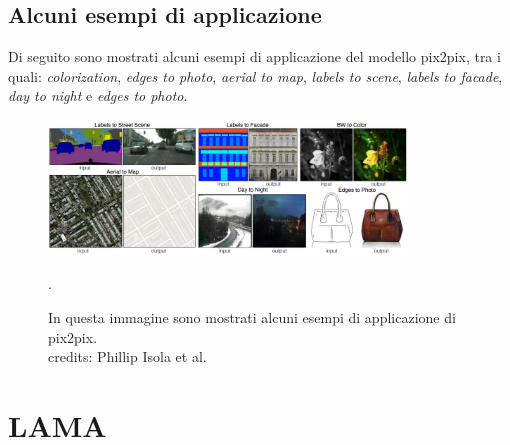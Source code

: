 \subsection{Alcuni esempi di applicazione}
Di seguito sono mostrati alcuni esempi di applicazione del modello pix2pix, tra i quali: \textit{colorization}, \textit{edges to photo}, \textit{aerial to map},
\textit{labels to scene}, \textit{labels to facade}, \textit{day to night} e \textit{edges to photo}.
    \begin{figure}[H]
        \centering
        \includegraphics[width=0.85\textwidth]{imgs/pix2pix_example_tasks.png}
        \caption{In questa immagine sono mostrati alcuni esempi di applicazione di pix2pix.\\
            credits: Phillip Isola et al. \cite{isola2018imagetoimage}}.
        \label{fig:pix2pix_example_tasks}
    \end{figure}


\section{LAMA}

